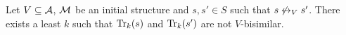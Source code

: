 \documentclass{article}
\begin{document}
\begin{proposition}\label{pro:k}
  Let $V\subseteq {\cal A}$, ${\cal M}$ be an initial  structure and $s,s'\in S$
  such that $s\not\leftrightarrow_V s'$.
  There exists a least $k$ such that
  $\textrm{Tr}_k(s)$ and $\textrm{Tr}_k(s')$ are not $V$-bisimilar.
\end{proposition}



\end{document}
